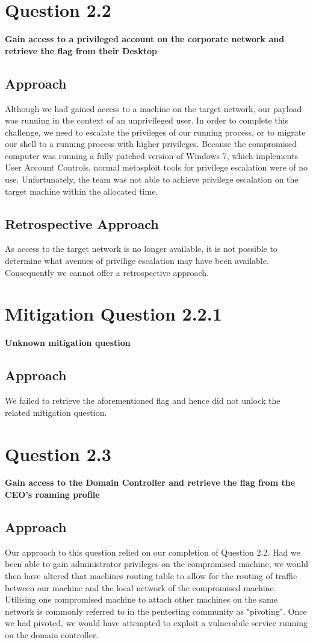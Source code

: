 \section{Question 2.2}
\textbf{Gain access to a privileged account on the corporate network and
retrieve the flag from their Desktop}
\subsection{Approach}
Although we had gained access to a machine on the target network, our payload was running in the context of an unprivileged user. In order to complete this challenge, we need to escalate the privileges of our running process, or to migrate our shell to a running process with higher privileges. Because the compromised computer was running a fully patched version of Windows 7, which implements User Account Controls, normal metasploit tools for privilege escalation were of no use. Unfortunately, the team was not able to achieve privilege escalation on the target machine within the allocated time.
\subsection{Retrospective Approach}
As access to the target network is no longer available, it is not possible to determine what avenues of privilige escalation may have been available. Consequently we cannot offer a retrospective approach.
\section{Mitigation Question 2.2.1}
\textbf{Unknown mitigation question}
\subsection{Approach}
We failed to retrieve the aforementioned flag and hence did not unlock the
related mitigation question.

\section{Question 2.3}
\textbf{Gain access to the Domain Controller and retrieve the flag from the
CEO's roaming profile}
\subsection{Approach}
Our approach to this question relied on our completion of Question 2.2. Had we been able to gain administrator privileges on the compromised machine, we would then have altered that machines routing table to allow for the routing of traffic between our machine and the local network of the compromised machine. Utilising one compromised machine to attach other machines on the same network is commonly referred to in the pentesting community as "pivoting". Once we had pivoted, we would have attempted to exploit a vulnerabile service running on the domain controller. 
